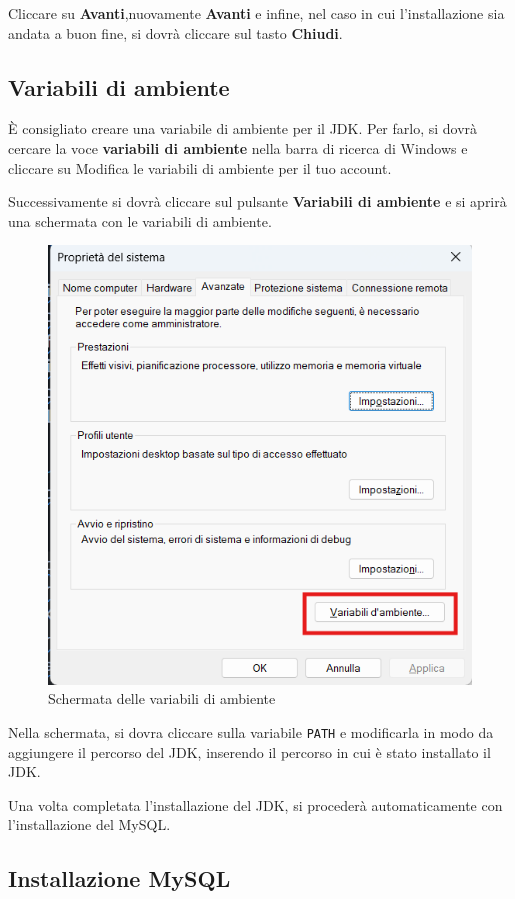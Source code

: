 Cliccare su \textbf{Avanti},nuovamente \textbf{Avanti} e infine, nel caso in cui l'installazione sia andata a buon fine, si dovrà cliccare sul tasto \textbf{Chiudi}.

\subsection{Variabili di ambiente}

È consigliato creare una variabile di ambiente per il JDK. Per farlo, si dovrà cercare la voce \textbf{variabili di ambiente} nella barra di ricerca di Windows e cliccare su {Modifica le variabili di ambiente per il tuo account}.

Successivamente si dovrà cliccare sul pulsante \textbf{Variabili di ambiente} e si aprirà una schermata con le variabili di ambiente. 



\begin{figure}[h!]
    \centering
    \includegraphics[width=.6\textwidth]{images/variabili ambienti.png}
    \caption{Schermata delle variabili di ambiente}
\end{figure}

Nella schermata, si dovra cliccare sulla variabile \texttt{PATH} e modificarla in modo da aggiungere il percorso del JDK, inserendo il percorso in cui è stato installato il JDK.

Una volta completata l'installazione del JDK, si procederà automaticamente con l'installazione del MySQL.



\subsection{Installazione MySQL}

